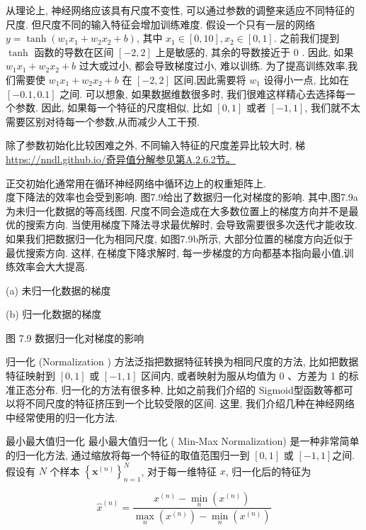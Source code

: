 \documentclass[10pt]{article}
\begin{document}
从理论上, 神经网络应该具有尺度不变性, 可以通过参数的调整来适应不同特征的尺度. 但尺度不同的输入特征会增加训练难度. 假设一个只有一层的网络 $y=\tanh \left(w_{1} x_{1}+w_{2} x_{2}+b\right)$, 其中 $x_{1} \in[0,10], x_{2} \in[0,1]$. 之前我们提到 $\tanh$ 函数的导数在区间 $[-2,2]$ 上是敏感的, 其余的导数接近于 0 . 因此, 如果 $w_{1} x_{1}+w_{2} x_{2}+b$ 过大或过小, 都会导致梯度过小, 难以训练. 为了提高训练效率,我们需要使 $w_{1} x_{1}+w_{2} x_{2}+b$ 在 $[-2,2]$ 区间,因此需要将 $w_{1}$ 设得小一点, 比如在 $[-0.1,0.1]$ 之间. 可以想象, 如果数据维数很多时, 我们很难这样精心去选择每一个参数. 因此, 如果每一个特征的尺度相似, 比如 $[0,1]$ 或者 $[-1,1]$, 我们就不太需要区别对待每一个参数,从而减少人工干预.

除了参数初始化比较困难之外, 不同输入特征的尺度差异比较大时, 梯 \href{https://nndl.github.io/%E5%A5%87%E5%BC%82%E5%80%BC%E5%88%86%E8%A7%A3%E5%8F%82%E8%A7%81%E7%AC%ACA.2.6.2%E8%8A%82%E3%80%82}{https://nndl.github.io/奇异值分解参见第A.2.6.2节。}

正交初始化通常用在循环神经网络中循环边上的权重矩阵上.\\
度下降法的效率也会受到影响. 图7.9给出了数据归一化对梯度的影响. 其中,图7.9a为未归一化数据的等高线图. 尺度不同会造成在大多数位置上的梯度方向并不是最优的搜索方向. 当使用梯度下降法寻求最优解时, 会导致需要很多次迭代才能收玫. 如果我们把数据归一化为相同尺度, 如图7.9b所示, 大部分位置的梯度方向近似于最优搜索方向. 这样, 在梯度下降求解时, 每一步梯度的方向都基本指向最小值,训练效率会大大提高.



(a) 未归一化数据的梯度



(b) 归一化数据的梯度

图 7.9 数据归一化对梯度的影响

归一化 (Normalization ) 方法泛指把数据特征转换为相同尺度的方法, 比如把数据特征映射到 $[0,1]$ 或 $[-1,1]$ 区间内, 或者映射为服从均值为 0 、方差为 1 的标准正态分布. 归一化的方法有很多种, 比如之前我们介绍的 Sigmoid型函数等都可以将不同尺度的特征挤压到一个比较受限的区间. 这里, 我们介绍几种在神经网络中经常使用的归一化方法.

最小最大值归一化 最小最大值归一化 ( Min-Max Normalization) 是一种非常简单的归一化方法, 通过缩放将每一个特征的取值范围归一到 $[0,1]$ 或 $[-1,1]$之间. 假设有 $N$ 个样本 $\left\{\boldsymbol{x}^{(n)}\right\}_{n=1}^{N}$, 对于每一维特征 $x$, 归一化后的特征为


\begin{equation*}
\hat{x}^{(n)}=\frac{x^{(n)}-\min _{n}\left(x^{(n)}\right)}{\max _{n}\left(x^{(n)}\right)-\min _{n}\left(x^{(n)}\right)} \tag{7.47}
\end{equation*}
\end{document}
